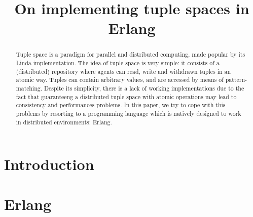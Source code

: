 \documentclass[submission,copyright,creativecommons]{eptcs}
\title{On implementing tuple spaces in Erlang}
\begin{document}
\maketitle

\begin{abstract}
Tuple space is a paradigm for parallel and distributed computing, made popular by its Linda implementation.
The idea of tuple space is very simple: it consists of a (distributed) repository where agents can read, write and withdrawn tuples in an atomic way. Tuples can contain arbitrary values, and are accessed by means of pattern-matching. Despite its simplicity, there is a lack of working implementations due to the fact that guaranteeng a distributed tuple space with atomic operations may lead to consistency and performances problems.  In this paper, we try to cope with this  problems by resorting to a programming language which is natively designed to work in distributed environments: Erlang. 
\end{abstract}

\section{Introduction}\label{sec:intro}


\section{Erlang} \label{sec:erlang}


\nocite{*}


\end{document}
